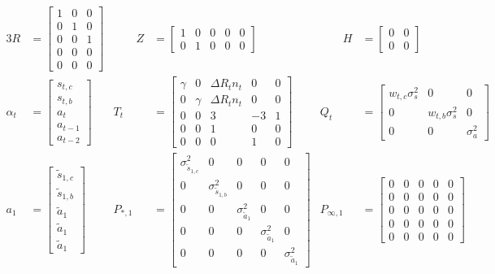 \documentclass{article}
\begin{document}
\begin{alignat*}{3}
R &= \begin{bmatrix}
1 & 0 & 0 \\ 
0 & 1 & 0\\ 
0 & 0 & 1\\ 
0 & 0 & 0\\ 
0 & 0 & 0 
\end{bmatrix} &\qquad 
Z &= \begin{bmatrix}
1 & 0 & 0 & 0 & 0 \\ 
0 & 1 & 0 & 0 & 0
\end{bmatrix} &\qquad 
H &= \begin{bmatrix}
0 & 0 \\ 
0 & 0
\end{bmatrix} \\
\alpha_t &= \begin{bmatrix}
s_{t,c}\\
s_{t,b}\\ 
a_t\\ 
a_{t-1}\\ 
a_{t-2}
\end{bmatrix} & 
T_t &= \begin{bmatrix}
 \gamma & 0 & \Delta R_tn_t & 0 & 0\\ 
 0 & \gamma & \Delta R_tn_t & 0 & 0 \\ 
 0 & 0 & 3 & -3 & 1 \\ 
 0 & 0 & 1 & 0 & 0\\ 
 0 & 0 & 0 & 1 & 0
\end{bmatrix}  & 
Q_t &= \begin{bmatrix}
w_{t,c}\sigma^2_s & 0 & 0 \\ 
0 & w_{t,b}\sigma^2_s  & 0 \\ 
0 & 0 & \sigma^2_a
\end{bmatrix} \\
a_1 &= \begin{bmatrix}
\tilde{s}_{1,c}\\ 
\tilde{s}_{1,b}\\ 
\tilde{a}_1\\ 
\tilde{a}_1 \\
\tilde{a}_1
\end{bmatrix} & 
P_{*, 1} &= \begin{bmatrix}
\sigma^2_{\tilde{s}_{1,c}} & 0 & 0 & 0 & 0\\ 
0 & \sigma^2_{\tilde{s}_{1,b}} & 0 & 0 & 0\\ 
0 & 0 & \sigma^2_{\tilde{a}_1} & 0 & 0\\ 
0 & 0 & 0 & \sigma^2_{\tilde{a}_1} & 0 \\ 
0 & 0 & 0 & 0 & \sigma^2_{\tilde{a}_1}
\end{bmatrix} &  
P_{\infty, 1} &= \begin{bmatrix}
0 & 0 & 0 & 0 & 0\\ 
0 & 0 & 0 & 0 & 0\\ 
0 & 0 & 0 & 0 & 0\\ 
0 & 0 & 0 & 0 & 0 \\ 
0 & 0 & 0 & 0 & 0
\end{bmatrix}
\end{alignat*}
\end{document}
